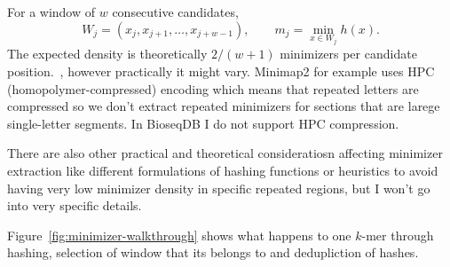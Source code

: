 For a window of $w$ consecutive candidates,
\[
  W_j=(x_j,x_{j+1},\ldots,x_{j+w-1}),
  \qquad
  m_j=\min_{x\in W_j}h(x).
\]
The expected density is theoretically $2/(w+1)$ minimizers per
candidate position.~\cite{shur_minimum_density_2025}, however practically it might vary. Minimap2 for example uses 
HPC (homopolymer-compressed) encoding which means that repeated letters are compressed so we don't extract repeated minimizers for sections that are larege single-letter segments.
In BioseqDB I do not support HPC compression.

There are also other practical and theoretical consideratiosn affecting minimizer extraction like different formulations of hashing functions or heuristics to avoid having very low minimizer density in 
specific repeated regions, but I won't go into very specific details.

Figure~\ref{fig:minimizer-walkthrough} shows what happens to one $k$-mer through hashing,
selection of window that its belongs to and dedupliction of hashes.

